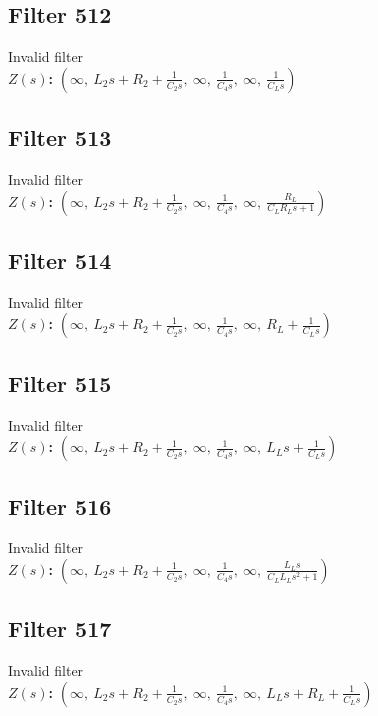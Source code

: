 \documentclass{article}
\begin{document}
\subsection*{Filter 512}
Invalid filter \\ 
\textbf{$Z(s)$:} $\left( \infty, \  L_{2} s + R_{2} + \frac{1}{C_{2} s}, \  \infty, \  \frac{1}{C_{4} s}, \  \infty, \  \frac{1}{C_{L} s}\right)$ \\ 
\subsection*{Filter 513}
Invalid filter \\ 
\textbf{$Z(s)$:} $\left( \infty, \  L_{2} s + R_{2} + \frac{1}{C_{2} s}, \  \infty, \  \frac{1}{C_{4} s}, \  \infty, \  \frac{R_{L}}{C_{L} R_{L} s + 1}\right)$ \\ 
\subsection*{Filter 514}
Invalid filter \\ 
\textbf{$Z(s)$:} $\left( \infty, \  L_{2} s + R_{2} + \frac{1}{C_{2} s}, \  \infty, \  \frac{1}{C_{4} s}, \  \infty, \  R_{L} + \frac{1}{C_{L} s}\right)$ \\ 
\subsection*{Filter 515}
Invalid filter \\ 
\textbf{$Z(s)$:} $\left( \infty, \  L_{2} s + R_{2} + \frac{1}{C_{2} s}, \  \infty, \  \frac{1}{C_{4} s}, \  \infty, \  L_{L} s + \frac{1}{C_{L} s}\right)$ \\ 
\subsection*{Filter 516}
Invalid filter \\ 
\textbf{$Z(s)$:} $\left( \infty, \  L_{2} s + R_{2} + \frac{1}{C_{2} s}, \  \infty, \  \frac{1}{C_{4} s}, \  \infty, \  \frac{L_{L} s}{C_{L} L_{L} s^{2} + 1}\right)$ \\ 
\subsection*{Filter 517}
Invalid filter \\ 
\textbf{$Z(s)$:} $\left( \infty, \  L_{2} s + R_{2} + \frac{1}{C_{2} s}, \  \infty, \  \frac{1}{C_{4} s}, \  \infty, \  L_{L} s + R_{L} + \frac{1}{C_{L} s}\right)$ \\ 
\end{document}
